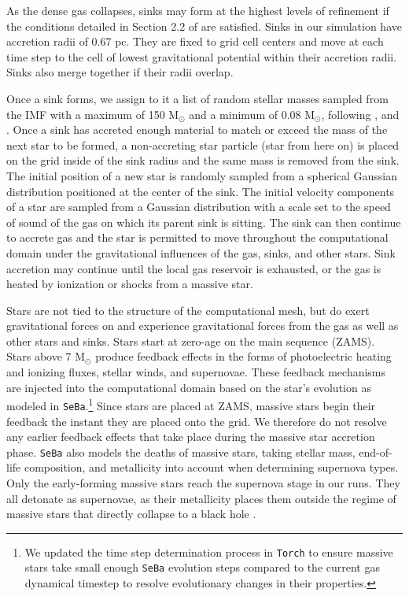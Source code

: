 \documentclass[twoside]{drexel-thesis}
\begin{document}
\begin{thesis}
As the dense gas collapses, sinks may form at the highest levels of refinement if the conditions detailed in Section 2.2 of \citet{federrath_modeling_2010} are satisfied. Sinks in our simulation have accretion radii of 0.67 pc. They are fixed to grid cell centers and move at each time step to the cell of lowest gravitational potential within their accretion radii. Sinks also merge together if their radii overlap.

Once a sink forms, we assign to it a list of random stellar masses sampled from the \citet{kroupa_initial_2002} IMF with a maximum of 150 M$_\odot$ and a minimum of 0.08 M$_\odot$, following \citet{weidner_maximum_2006}, \citet{sormani_simple_2017} and \citet{wall_collisional_2019}. Once a sink has accreted enough material to match or exceed the mass of the next star to be formed, a non-accreting star particle (star from here on) is placed on the grid inside of the sink radius and the same mass is removed from the sink. The initial position of a new star is randomly sampled from a spherical Gaussian distribution positioned at the center of the sink. The initial velocity components of a star are sampled from a Gaussian distribution with a scale set to the speed of sound of the gas on which its parent sink is sitting.
The sink can then continue to accrete gas and the star is permitted to move throughout the computational domain under the gravitational influences of the gas, sinks, and other stars. Sink accretion may continue until the local gas reservoir is exhausted, or the gas is heated by ionization or shocks from a massive star.

Stars are not tied to the structure of the computational mesh, but do exert gravitational forces on and experience gravitational forces from the gas as well as other stars and sinks. Stars start at zero-age on the main sequence (ZAMS). Stars above 7 M$_{\odot}$ produce feedback effects in the forms of photoelectric heating and ionizing fluxes, stellar winds, and supernovae. These feedback mechanisms are injected into the computational domain based on the star's evolution as modeled in \texttt{SeBa}.\footnote{We updated the time step determination process in \texttt{Torch} to ensure massive stars take small enough \texttt{SeBa} evolution steps compared to the current gas dynamical timestep to resolve evolutionary changes in their properties.}
Since stars are placed at ZAMS, massive stars begin their feedback the instant they are placed onto the grid. We therefore do not resolve any earlier feedback effects that take place during the massive star accretion phase. \texttt{SeBa} also models the deaths of massive stars, taking stellar mass, end-of-life composition, and metallicity into account when determining supernova types. Only the early-forming massive stars reach the supernova stage in our runs. They all detonate as supernovae, as their metallicity places them outside the regime of massive stars that directly collapse to a black hole \citep{heger_how_2003}.


\end{thesis}
\end{document}
